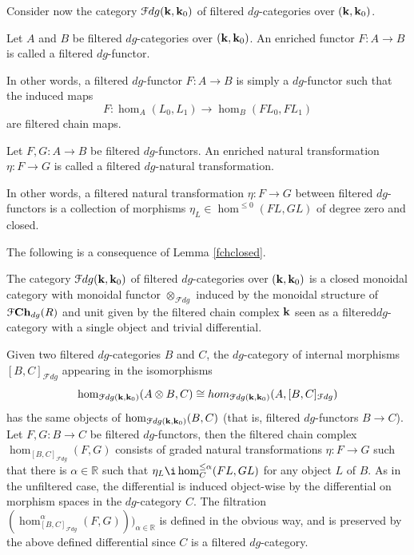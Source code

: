 Consider now the category $\mathcal{F}dg(\mathbf{k},\mathbf{k}_0)$ of filtered $dg$-categories over $(\mathbf{k},\mathbf{k}_0)$. 
\begin{dfn}
    Let $A$ and $B$ be filtered $dg$-categories over $(\mathbf{k},\mathbf{k}_0)$. An enriched functor $F\colon A\to B$ is called a filtered $dg$-functor.
\end{dfn}
\noindent In other words, a filtered $dg$-functor $F\colon A\to B$ is simply a $dg$-functor such that the induced maps $$F\colon \hom_A(L_0,L_1)\to \hom_B(FL_0,FL_1)$$ are filtered chain maps.
\begin{dfn}
    Let $F,G\colon A\to B$ be filtered $dg$-functors. An enriched natural transformation $\eta\colon F\to G$ is called a filtered $dg$-natural transformation.
\end{dfn}
\noindent In other words, a filtered natural transformation $\eta\colon F\to G$ between filtered $dg$-functors is a collection of morphisms $\eta_L\in \hom^{\leq 0}(FL,GL)$ of degree zero and closed.

The following is a consequence of Lemma \ref{fchclosed}.
\begin{dfn}
    The category $\mathcal{F}dg(\mathbf{k},\mathbf{k}_0)$ of filtered $dg$-categories over $(\mathbf{k},\mathbf{k}_0)$ is a closed monoidal category with monoidal functor $\otimes_{\mathcal{F}dg}$ induced by the monoidal structure of $\mathcal{F}\mathbf{Ch}_{dg}(R)$ and unit given by the filtered chain complex $\mathbf{k}$ seen as a filtered$dg$-category with a single object and trivial differential.   
\end{dfn}
\noindent Given two filtered $dg$-categories $B$ and $C$, the $dg$-category of internal morphisms $[B,C]_{\mathcal{F}dg}$ appearing in the isomorphisms $$\hom_{\mathcal{F}dg(\mathbf{k},\mathbf{k}_0)}(A\otimes B,C)\cong hom_{\mathcal{F}dg(\mathbf{k},\mathbf{k}_0)}(A, [B,C]_{\mathcal{F}dg})$$ has the same objects of $\hom_{\mathcal{F}dg(\mathbf{k},\mathbf{k}_0)}(B,C)$ (that is, filtered $dg$-functors $B\to C$). Let $F,G\colon B\to C$ be filtered $dg$-functors, then the filtered chain complex $\hom_{[B,C]_{\mathcal{F}dg}}(F,G)$ consists of graded natural transformations $\eta\colon F\to G$ such that there is $\alpha\in \mathbb{R}$ such that $\eta_L\i \hom_C^{\leq \alpha}(FL,GL)$ for any object $L$ of $B$. As in the unfiltered case, the differential is induced object-wise by the differential on morphism spaces in the $dg$-category $C$. The filtration $(\hom_{[B,C]_{\mathcal{F}dg}}^\alpha(F,G)))_{\alpha\in \mathbb{R}}$ is defined in the obvious way, and is preserved by the above defined differential since $C$ is a filtered $dg$-category.


